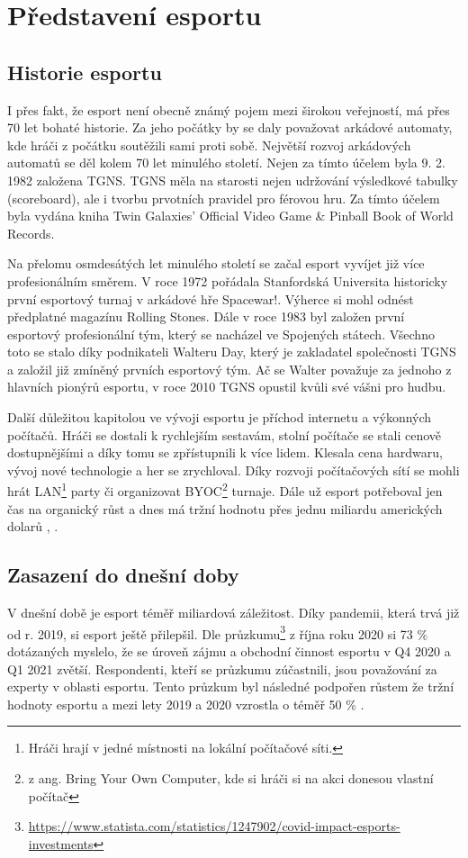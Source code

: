\chapter{Představení esportu}
\section{Historie esportu}
I přes fakt, že esport není obecně známý pojem mezi širokou veřejností, má přes 70 let bohaté historie. Za jeho počátky by se
daly považovat arkádové automaty, kde hráči z počátku soutěžili sami proti sobě. Největší rozvoj arkádových automatů se děl kolem 70 let minulého 
století. Nejen za tímto účelem byla 9. 2. 1982 založena \ac{TGNS}. \ac{TGNS} měla na starosti nejen udržování výsledkové tabulky (scoreboard),
ale i tvorbu prvotních pravidel pro férovou hru. Za tímto účelem byla vydána kniha Twin Galaxies' Official Video Game \& Pinball Book of World Records.

Na přelomu osmdesátých let minulého století se začal esport vyvíjet již více profesionálním směrem. V roce 1972 pořádala Stanfordská Universita historicky první
esportový turnaj v arkádové hře Spacewar!. Výherce si mohl odnést předplatné magazínu Rolling Stones. Dále v roce 1983 byl založen první esportový profesionální tým,
který se nacházel ve Spojených státech. Všechno toto se stalo díky podnikateli Walteru Day, který je zakladatel společnosti \ac{TGNS} a založil již zmíněný
prvních esportový tým. Ač se Walter považuje za jednoho z hlavních pionýrů esportu, v roce 2010 \ac{TGNS} opustil kvůli své vášni pro hudbu.

Další důležitou kapitolou ve vývoji esportu je příchod internetu a výkonných počítačů. Hráči se dostali k rychlejším sestavám, stolní počítače se stali cenově dostupnějšími a díky tomu
se zpřístupnili k více lidem. Klesala cena hardwaru, vývoj nové technologie a her se zrychloval. Díky rozvoji počítačových sítí se mohli hrát LAN\footnote{Hráči hrají v jedné
místnosti na lokální počítačové síti.} party či organizovat BYOC\footnote{z ang. Bring Your Own Computer, kde si hráči si na akci donesou vlastní počítač} turnaje. Dále už esport 
potřeboval jen čas na organický růst a dnes má tržní hodnotu přes jednu miliardu amerických dolarů \cite{Gough2021}, \cite{Larch2019}.

\section{Zasazení do dnešní doby}
V dnešní době je esport téměř miliardová záležitost. Díky pandemii, která trvá již od r. 2019, si esport ještě přilepšil.
Dle průzkumu\footnote{\url{https://www.statista.com/statistics/1247902/covid-impact-esports-investments}}
z října roku 2020 si 73 \% dotázaných myslelo, že se úroveň zájmu a obchodní činnost esportu v Q4 2020 a Q1 2021
zvětší. Respondenti, kteří se průzkumu zúčastnili, jsou považování za experty v oblasti esportu. Tento průzkum byl následné podpořen růstem že tržní hodnoty
esportu a mezi lety 2019 a 2020 vzrostla o téměř 50 \% \cite{Gough2021}.

